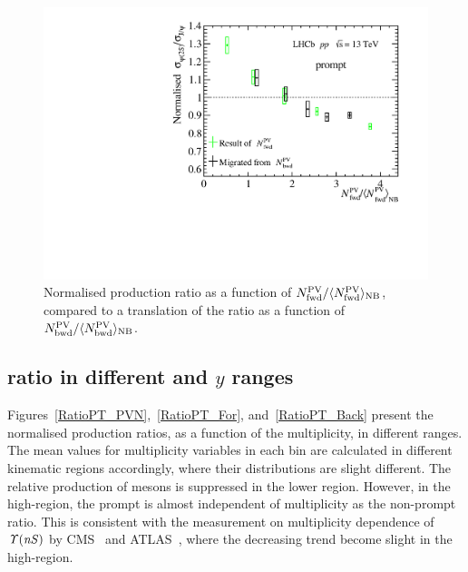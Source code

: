 \documentclass[12pt,a4paper]{article}
\begin{document}
\begin{figure}[H] 
    \begin{center}
      \includegraphics[width=0.6\linewidth]{pdf/Result/AllBtoF.pdf}
    \end{center}
	\caption{Normalised production ratio as a function of $N_{\rm fwd}^{\rm PV}/\langle N_{\rm fwd}^{\rm PV}\rangle_{\rm{NB}}$, compared to a translation of the ratio as a function of $N_{\rm bwd}^{\rm PV}/\langle N_{\rm bwd}^{\rm PV}\rangle_{\rm{NB}}$.
      } 
    \label{BtoF}
\end{figure}

\subsection{ ratio in different \pt and $y$ ranges}
Figures~\ref{RatioPT_PVN},~\ref{RatioPT_For}, and~\ref{RatioPT_Back} present the normalised production ratios, as a function of the multiplicity, in different \pt ranges. The mean values for multiplicity variables in each bin are calculated in different kinematic regions accordingly, where their distributions are slight different. The relative production of \psitwos mesons is suppressed in the lower \pt region. However, in the high-\pt region, the prompt is almost independent of multiplicity as the non-prompt ratio. This is consistent with the measurement on multiplicity dependence of $\it{\Upsilon}(nS)$ by CMS~\cite{CMS:2020fae} and ATLAS~\cite{ATLAS-CONF-2022-023}, where the decreasing trend become slight in the high-\pt region.
\end{document}
